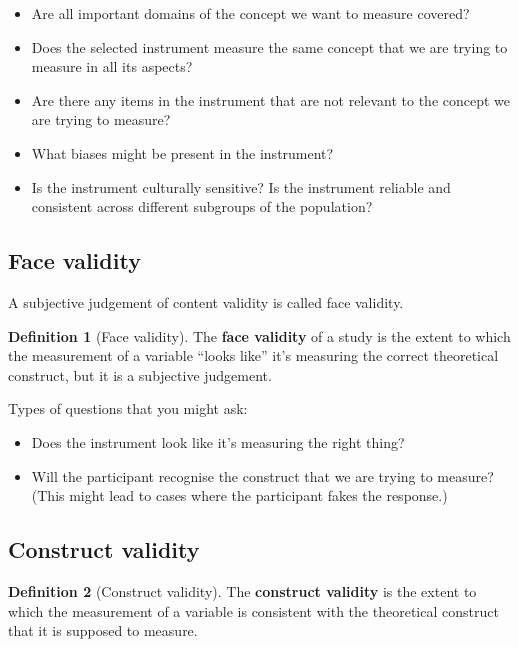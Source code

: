 \documentclass[
  11pt,
]{book}
\providecommand{\tightlist}{%
  \setlength{\itemsep}{0pt}\setlength{\parskip}{0pt}}
\theoremstyle{definition}
\newtheorem{definition}{Definition}[chapter]
\theoremstyle{definition}
\theoremstyle{definition}
\theoremstyle{definition}
\theoremstyle{remark}
\begin{document}
\begin{itemize}
\tightlist
\item
  Are all important domains of the concept we want to measure covered?
\item
  Does the selected instrument measure the same concept that we are trying to measure in all its aspects?
\item
  Are there any items in the instrument that are not relevant to the concept we are trying to measure?
\item
  What biases might be present in the instrument?
\item
  Is the instrument culturally sensitive? Is the instrument reliable and consistent across different subgroups of the population?
\end{itemize}

\hypertarget{face-validity}{%
\subsection{Face validity}\label{face-validity}}

A subjective judgement of content validity is called face validity.

\begin{definition}[Face validity]
\protect\hypertarget{def:deffacevalidity}{}\label{def:deffacevalidity}The \textbf{face validity} of a study is the extent to which the measurement of a variable ``looks like'' it's measuring the correct theoretical construct, but it is a subjective judgement.
\end{definition}

Types of questions that you might ask:

\begin{itemize}
\tightlist
\item
  Does the instrument look like it's measuring the right thing?
\item
  Will the participant recognise the construct that we are trying to measure? (This might lead to cases where the participant fakes the response.)
\end{itemize}

\hypertarget{construct-validity}{%
\subsection{Construct validity}\label{construct-validity}}

\begin{definition}[Construct validity]
\protect\hypertarget{def:defconstructvalidity}{}\label{def:defconstructvalidity}The \textbf{construct validity} is the extent to which the measurement of a variable is consistent with the theoretical construct that it is supposed to measure.
\end{definition}
\end{document}
